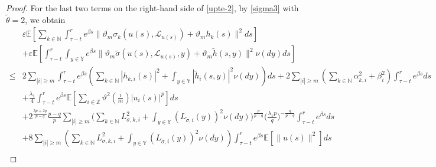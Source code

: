 \documentclass[11pt]{article}
\numberwithin{equation}{section}
\theoremstyle{plain}
\begin{document}
\begin{proof}
 For the last two terms on the right-hand side of \eqref{upte-2},
 by \eqref{sigma3} with $\tilde{\theta} = 2$, we obtain
 \begin{align}\label{upte-6}
        & \varepsilon \mathbb{E}
               \left[ \sum_{k \in \mathbb{N} } \int_{\tau-t}^{r} e^{\beta s}
                            \|\vartheta_m \sigma_k(u(s), \mathcal{L}_{u(s)})
                              + \vartheta_m h_k(s)\|^2 ds
               \right]  \nonumber \\
        & + \varepsilon \mathbb{E}
               \left[ \int_{\tau-t}^{r} \int_{y \in \mathbb{Y} } e^{\beta s}
                            \|\vartheta_m \widetilde{\sigma}(u(s), \mathcal{L}_{u(s)},y)
                                        + \vartheta_m \widetilde{h}(s, y)\|^2
                       \nu(dy) ds
               \right]  \nonumber \\
  \le & 2 \sum_{|i|\ge m}
                 \int_{\tau-t}^{r} e^{\beta s}
                     \left( \sum_{k \in \mathbb{N} } |h_{k,i}(s)|^2 
                               + \int_{y \in \mathbb{Y} } |\widetilde{h}_{i}(s,y)|^2 \nu(dy)
                     \right) ds
         + 2 \sum_{|i| \ge m} 
                      \left( \sum_{k \in \mathbb{N} } \alpha_{k,i}^2
                                + \beta_i^2
                      \right)
                      \int_{\tau-t}^{r} e^{\beta s} ds   \nonumber\\
       & + \frac{\lambda_1}{4} \int_{\tau-t}^{r} e^{\beta s}
                                  \mathbb{E}
                                     \left[ \sum_{i \in \mathbb{Z}}
                                                 {\vartheta}^2(\frac{i}{m}) |u_i(s)|^p
                                     \right] ds  \nonumber\\
       & + 2^{\frac{3p+2q}{p-q} } \frac{p-q}{p}
                        \sum_{|i| \ge m} 
                              \Big( \sum_{k \in \mathbb{N} } L^2_{\sigma,k,i} 
                                       + \int_{y \in \mathbb{Y} } (L_{\tilde{\sigma},i}(y) )^2 \nu(dy)
                              \Big)^{ \frac{p}{p-q} }
                              \Big( \frac{\lambda_1 p}{q} \Big)^{-\frac{q}{p-q} }
                        \int_{\tau-t}^{r} e^{\beta s} ds  \nonumber\\
       & + 8 \sum_{|i| \ge m} 
                       \left( \sum_{k \in \mathbb{N} } L_{\sigma, k,i}^2 
                                 + \int_{y \in \mathbb{Y} } (L_{\tilde{\sigma},i}(y) )^2 \nu(dy)
                       \right)
               \int_{\tau-t}^{r} e^{\beta s} \mathbb{E} \left[ \|u(s)\|^2 \right] ds  \nonumber\\                        

\end{align}
\end{proof}
\end{document}
